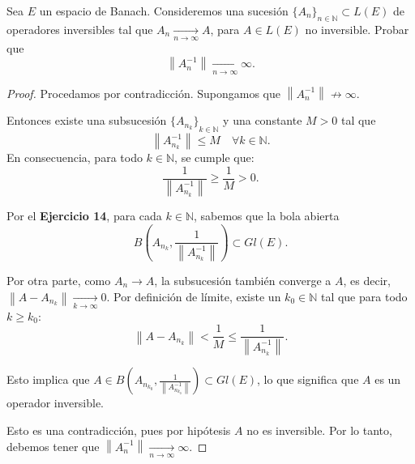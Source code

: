 \documentclass{article}
\theoremstyle{definition}
\newcommand{\N}{\mathbb{N}}
\newcommand{\norm}[1]{\left\lVert #1 \right\rVert}       %
\newenvironment{ejercicio}[1]{\begin{trivlist}
\item[\hskip \labelsep {\bfseries Ejercicio}\hskip \labelsep {\bfseries #1.}]}{\end{trivlist}}
\begin{document}
\begin{ejercicio}{15}
    Sea \(E\) un espacio de Banach. Consideremos una sucesión \( {\{A_n\}}_{n \in \N} \subset L(E) \) de operadores inversibles tal que \(A_n\xrightarrow[n\to\infty]{} A\), para \( A \in L(E) \) no inversible. Probar que
    \[
        \norm{A_n^{-1}}\xrightarrow[n\to\infty]{}\infty.
    \]
\end{ejercicio}
\begin{proof}
    Procedamos por contradicción. Supongamos que \( \norm{A_n^{-1}} \not\to \infty \).

    Entonces existe una subsucesión \({\{A_{n_k}\}}_{k \in \N}\) y una constante \(M > 0\) tal que
    \[
        \norm{A_{n_k}^{-1}} \leq M \quad \forall k \in \N.
    \]
    En consecuencia, para todo \( k \in \N \), se cumple que:
    \[
        \frac{1}{\norm{A_{n_k}^{-1}}} \geq \frac{1}{M} > 0.
    \]

    Por el \textbf{Ejercicio 14}, para cada \( k \in \N \), sabemos que la bola abierta
    \[
        B\left(A_{n_k}, \frac{1}{\norm{A_{n_k}^{-1}}}\right) \subset Gl(E).
    \]

    Por otra parte, como \(A_n \to A\), la subsucesión también converge a \(A\), es decir, \(\norm{A - A_{n_k}} \xrightarrow[k\to\infty]{} 0\). Por definición de límite, existe un \( k_0 \in \N \) tal que para todo \(k \geq k_0\):
    \[
        \norm{A - A_{n_k}} < \frac{1}{M} \leq \frac{1}{\norm{A_{n_k}^{-1}}}.
    \]

    Esto implica que \(A \in B\left(A_{n_{k_0}}, \frac{1}{\norm{A_{n_{k_0}}^{-1}}}\right) \subset Gl(E)\), lo que significa que \(A\) es un operador inversible.

    Esto es una contradicción, pues por hipótesis \(A\) no es inversible. Por lo tanto, debemos tener que \(\norm{A_n^{-1}} \xrightarrow[n\to\infty]{} \infty \).
\end{proof}
\end{document}
